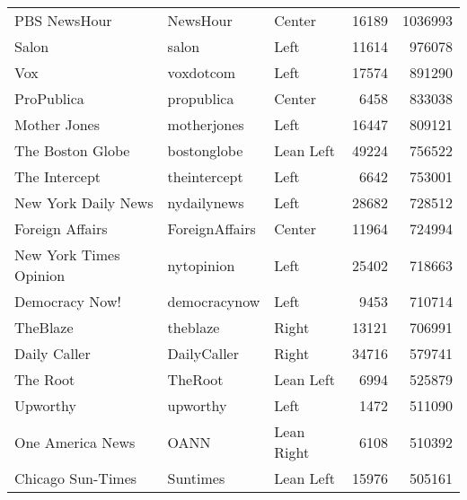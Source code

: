 \begin{center}
\begin{longtable}{lllrr}
                             PBS NewsHour &         NewsHour &        Center &             16189 &    1036993 \\
                                    Salon &            salon &          Left &             11614 &     976078 \\
                                      Vox &        voxdotcom &          Left &             17574 &     891290 \\
                               ProPublica &       propublica &        Center &              6458 &     833038 \\
                             Mother Jones &      motherjones &          Left &             16447 &     809121 \\
                         The Boston Globe &      bostonglobe &     Lean Left &             49224 &     756522 \\
                            The Intercept &     theintercept &          Left &              6642 &     753001 \\
                      New York Daily News &      nydailynews &          Left &             28682 &     728512 \\
                          Foreign Affairs &   ForeignAffairs &        Center &             11964 &     724994 \\
                   New York Times Opinion &       nytopinion &          Left &             25402 &     718663 \\
                           Democracy Now! &     democracynow &          Left &              9453 &     710714 \\
                                 TheBlaze &         theblaze &         Right &             13121 &     706991 \\
                             Daily Caller &      DailyCaller &         Right &             34716 &     579741 \\
                                 The Root &          TheRoot &     Lean Left &              6994 &     525879 \\
                                 Upworthy &         upworthy &          Left &              1472 &     511090 \\
                         One America News &             OANN &    Lean Right &              6108 &     510392 \\
                        Chicago Sun-Times &         Suntimes &     Lean Left &             15976 &     505161 \\

\end{longtable}
\end{center}
